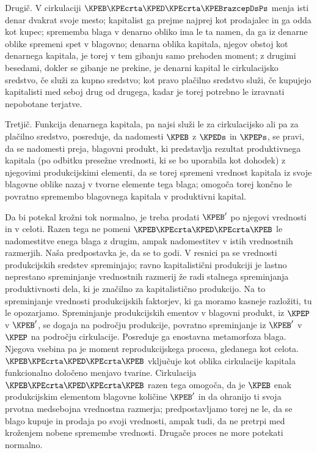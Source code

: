 \documentclass[kapital_02.tex]{subfiles}
\begin{document}
Drugič. V cirkulaciji \( \KPEB \KPEcrta \KPED \KPEcrta \KPEBrazcepDsPs \) menja isti denar dvakrat svoje mesto; kapitalist ga prejme najprej kot prodajalec in ga odda kot kupec; sprememba blaga v denarno obliko ima le ta namen, da ga iz denarne oblike spremeni spet v blagovno; denarna oblika kapitala, njegov obstoj kot denarnega kapitala, je torej v tem gibanju samo prehoden moment; z drugimi besedami, dokler se gibanje ne prekine, je denarni kapital le cirkulacijsko sredstvo, če služi za kupno sredstvo; kot pravo plačilno sredstvo služi, če kupujejo kapitalisti med seboj drug od drugega, kadar je torej potrebno le izravnati nepobotane terjatve.

Tretjič. Funkcija \KPEstran denarnega kapitala, pa najsi služi le za cirkulacijsko ali pa za plačilno sredstvo, posreduje, da nadomesti \( \KPEB \) z \( \KPEDs \) in \( \KPEPs \), se pravi, da se nadomesti preja, blagovni produkt, ki predstavlja rezultat produktivnega kapitala (po odbitku presežne vrednosti, ki se bo uporabila kot dohodek) z njegovimi produkcijskimi elementi, da se torej spremeni vrednost kapitala iz svoje blagovne oblike nazaj v tvorne elemente tega blaga; omogoča torej končno le povratno spremembo blagovnega kapitala v produktivni kapital.

Da bi potekal krožni tok normalno, je treba prodati \( \KPEB' \) po njegovi vrednosti in v celoti. Razen tega ne pomeni \( \KPEB \KPEcrta \KPED \KPEcrta \KPEB \) le nadomestitve enega blaga z drugim, ampak nadomestitev v istih vrednostnih razmerjih. Naša predpostavka je, da se to godi. V resnici pa se vrednosti produkcijskih sredstev spreminjajo; ravno kapitalistični produkciji je lastno neprestano spreminjanje vrednostnih razmerij že radi stalnega spreminjanja produktivnosti dela, ki je značilno za kapitalistično produkcijo. Na to spreminjanje vrednosti produkcijskih faktorjev, ki ga moramo kasneje razložiti, tu le opozarjamo. Spreminjanje produkcijskih ementov v blagovni produkt, iz \( \KPEP \) v \( \KPEB' \), se dogaja na področju produkcije, povratno spreminjanje iz \( \KPEB' \) v \( \KPEP \) na področju cirkulacije. Posreduje ga enostavna metamorfoza blaga. Njegova vsebina pa je moment reprodukcijskega procesa, gledanega kot celota. \( \KPEB \KPEcrta \KPED \KPEcrta \KPEB \) vključuje kot oblika cirkulacije kapitala funkcionalno določeno menjavo tvarine. Cirkulacija \( \KPEB \KPEcrta \KPED \KPEcrta \KPEB \) razen tega omogoča, da je \( \KPEB \) enak produkcijskim elementom blagovne količine \( \KPEB' \) in da ohranijo ti svoja prvotna medsebojna vrednostna razmerja; predpostavljamo torej ne le, da se blago kupuje in prodaja po svoji vrednosti, ampak tudi, da ne pretrpi med kroženjem nobene spremembe vrednosti. Drugače proces ne more potekati normalno.
\end{document}
